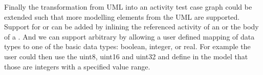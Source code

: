 Finally the transformation from UML into an activity test case graph could be extended such that more modelling elements from the UML are supported. Support for  or  can be added by inlining the referenced activity of an  or the body of a . And we can support arbitrary  by allowing a user defined mapping of data types to one of the basic data types: boolean, integer, or real. For example the user could then use the  uint8, uint16 and uint32 and define in the model that those are integers with a specified value range.
